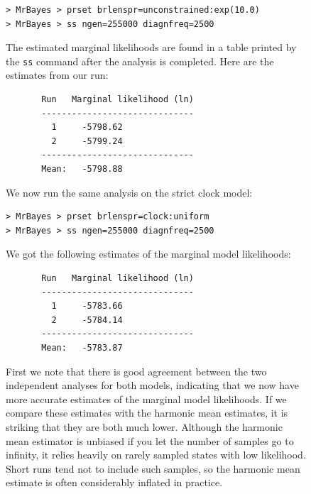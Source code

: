 \documentclass[12pt]{book}
\newcommand{\ttt}[1]{\texttt{#1}}
\begin{document}
\begin{figure}[h]
\begin{singlespacing}
\small
\begin{verbatim}
> MrBayes > prset brlenspr=unconstrained:exp(10.0)
> MrBayes > ss ngen=255000 diagnfreq=2500
\end{verbatim}
\end{singlespacing}
\normalsize

The estimated marginal likelihoods are found in a table printed by the \ttt{ss} command after the
analysis is completed. Here are the estimates from our run:

\begin{singlespacing}
\footnotesize
\begin{verbatim}
       Run   Marginal likelihood (ln)
       ------------------------------
         1     -5798.62   
         2     -5799.24   
       ------------------------------
       Mean:   -5798.88
\end{verbatim}
\end{singlespacing}
\normalsize

We now run the same analysis on the strict clock model:

\begin{singlespacing}
\small
\begin{verbatim}
> MrBayes > prset brlenspr=clock:uniform
> MrBayes > ss ngen=255000 diagnfreq=2500
\end{verbatim}
\end{singlespacing}
\normalsize

We got the following estimates of the marginal model likelihoods:

\begin{singlespacing}
\footnotesize
\begin{verbatim}
       Run   Marginal likelihood (ln)
       ------------------------------
         1     -5783.66   
         2     -5784.14   
       ------------------------------
       Mean:   -5783.87
\end{verbatim}
\end{singlespacing}
\normalsize

First we note that there is good agreement between the two independent analyses for both models,
indicating that we now have more accurate estimates of the marginal model likelihoods. If we
compare these estimates with the harmonic mean estimates, it is striking that they are both much
lower.  Although the harmonic mean estimator is unbiased if you let the number of samples go to
infinity, it relies heavily on rarely sampled states with low likelihood. Short runs tend not to
include such samples, so the harmonic mean estimate is often considerably inflated in practice.


\end{figure}
\end{document}
